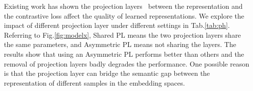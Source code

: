 \begin{table}[t]
\begin{floatrow}[2]
\end{floatrow}
\end{table}





Existing work has shown the projection layers~\citep{dong2022exploring, cao-etal-2022-exploring} between the representation and the contrastive loss affect the quality of learned representations.
We explore the impact of different projection layer under different settings in Tab.\ref{tab:ph}. Referring to Fig.\ref{fig:modelx}, Shared PL means the two projection layers share the same parameters, and Asymmetric PL means not sharing the layers. The results show that using an Asymmetric PL performs better than others and the removal of projection layers badly degrades the performance. One possible reason is that the projection layer can bridge the semantic gap between the representation of different samples in the embedding spaces. 


